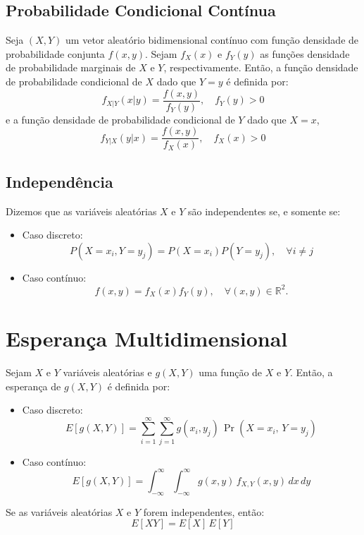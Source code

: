 \documentclass{article}
\begin{document}
\subsection{Probabilidade Condicional Contínua}
Seja $(X, Y)$ um vetor aleatório bidimensional contínuo com função densidade de probabilidade conjunta $f(x, y)$. 
Sejam $f_X(x)$ e $f_Y(y)$ as funções densidade de probabilidade marginais de $X$ e $Y$, respectivamente. 
Então, a função densidade de probabilidade condicional de $X$ dado que $Y = y$ é definida por:
    $$
    f_{X|Y}(x|y) = \frac{f(x, y)}{f_Y(y)}, \quad f_Y(y) > 0
    $$
e a função densidade de probabilidade condicional de $Y$ dado que $X = x$,
    $$
    f_{Y|X}(y|x) = \frac{f(x, y)}{f_X(x)}, \quad f_X(x) > 0
    $$

\subsection{Independência}
Dizemos que as variáveis aleatórias $X$ e $Y$ são independentes se, e somente se:

\begin{itemize}
    \item Caso discreto:
    $$
    P(X = x_i, Y = y_j) = P(X = x_i) P(Y = y_j), \quad \forall i \neq j
    $$
    \item Caso contínuo:
    $$
    f(x, y) = f_X(x) f_Y(y), \quad \forall (x, y) \in \mathbb{R}^2.
    $$
\end{itemize}

\section{Esperança Multidimensional}
Sejam $X$ e $Y$ variáveis aleatórias e $g(X,Y)$ uma função de $X$ e $Y$.
Então, a esperança de $g(X,Y)$ é definida por:

\begin{itemize}
    \item Caso discreto:
        $$
        E[g(X,Y)]
        = \sum_{i=1}^{\infty} \sum_{j=1}^{\infty}
        g(x_i, y_j)\, \Pr(X = x_i,\, Y = y_j)
        $$
    \item Caso contínuo:
        $$
        E[g(X,Y)]
        = \int_{-\infty}^{\infty}\!\!\int_{-\infty}^{\infty}
        g(x,y)\, f_{X,Y}(x,y)\, dx\, dy
        $$
\end{itemize}

Se as variáveis aleatórias $X$ e $Y$ forem independentes, então:
    $$
    E[XY] = E[X] \, E[Y]
    $$
\end{document}
